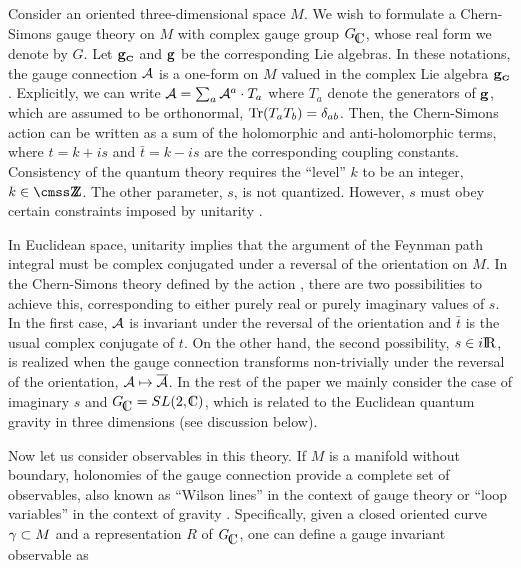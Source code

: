 
Consider an oriented three-dimensional space $M$.
We wish to formulate a Chern-Simons gauge theory on $M$
with complex gauge group $\CCG$, whose real form we denote by $G$.
Let ${\bf g}_{\scriptscriptstyle{{\bf C}}}$ and ${\bf g}$ be the corresponding Lie algebras.
In these notations, the gauge connection ${\cal A}$ is
a one-form on $M$ valued in the complex Lie algebra ${\bf g}_{\scriptscriptstyle{{\bf C}}}$.
Explicitly, we can write ${\cal A} = \sum_a {\cal A}^a \cdot T_a$
where $T_a$ denote the generators of ${\bf g}$,
which are assumed to be orthonormal, ${\rm Tr} (T_a T_b) = \delta_{ab}$.
Then, the Chern-Simons action can be written
as a sum of the holomorphic and anti-holomorphic terms,
%
\eqn{}
%
where $t=k+is$ and $\bar t=k-is$ are the corresponding
coupling constants. Consistency of the quantum theory
requires the ``level'' $k$ to be an integer, $k \in \Z$.
The other parameter, $s$, is not quantized. However,
$s$ must obey certain constraints imposed by unitarity \Wittencpx.

In Euclidean space, unitarity implies that
the argument of the Feynman path integral
%
\eqn{}
%
must be complex conjugated under a reversal of the orientation
on $M$. In the Chern-Simons theory defined by the action \iaction,
there are two possibilities to achieve this, corresponding to
either purely real or purely imaginary values of $s$.
In the first case, ${\cal A}$ is invariant under the reversal of
the orientation and $\bar t$ is the usual complex conjugate of $t$. 
On the other hand, the second possibility, $s \in i\relax{\rm I\kern-.18em R}$,
is realized when the gauge connection transforms non-trivially
under the reversal of the orientation, ${\cal A} \mapsto \overline {{\cal A}}$.
In the rest of the paper we mainly consider the case of
imaginary $s$ and $\CCG=SL(2,\IC)$, which is related to
the Euclidean quantum gravity in three dimensions
(see discussion below).

\ifig{}
{}

Now let us consider observables in this theory.
If $M$ is a manifold without boundary,
holonomies of the gauge connection provide a complete set
of observables, also known as ``Wilson lines'' in the context
of gauge theory or ``loop variables'' in the context
of gravity \RSloop.
Specifically, given a closed oriented curve $\gamma \subset M$
and a representation $R$ of $\CCG$, one can define a gauge
invariant observable as
%
\eqn{}
%

